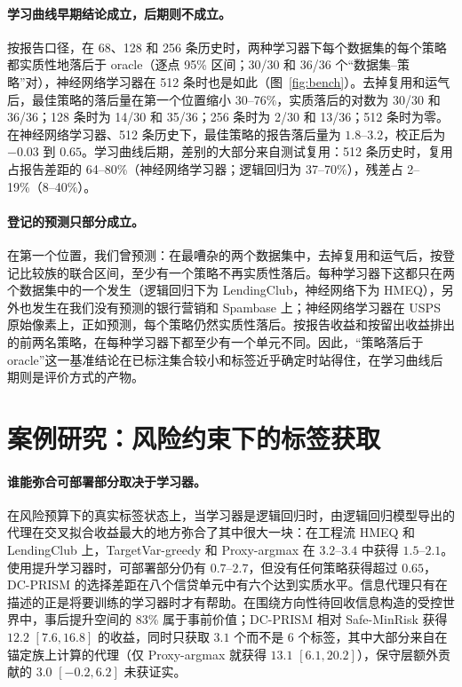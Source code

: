 \documentclass[runningheads]{llncs}
\begin{document}
\paragraph{学习曲线早期结论成立，后期则不成立。}按报告口径，在 68、128 和 256 条历史时，两种学习器下每个数据集的每个策略都实质性地落后于 oracle（逐点 95\% 区间；30/30 和 36/36 个“数据集--策略”对），神经网络学习器在 512 条时也是如此（图~\ref{fig:bench}）。去掉复用和运气后，最佳策略的落后量在第一个位置缩小 30--76\%，实质落后的对数为 30/30 和 36/36；128 条时为 14/30 和 35/36；256 条时为 2/30 和 13/36；512 条时为零。在神经网络学习器、512 条历史下，最佳策略的报告落后量为 $1.8$--$3.2$，校正后为 $-0.03$ 到 $0.65$。学习曲线后期，差别的大部分来自测试复用：512 条历史时，复用占报告差距的 64--80\%（神经网络学习器；逻辑回归为 37--70\%），残差占 2--19\%（8--40\%）。

\paragraph{登记的预测只部分成立。}在第一个位置，我们曾预测：在最嘈杂的两个数据集中，去掉复用和运气后，按登记比较族的联合区间，至少有一个策略不再实质性落后。每种学习器下这都只在两个数据集中的一个发生（逻辑回归下为 LendingClub，神经网络下为 HMEQ），另外也发生在我们没有预测的银行营销和 Spambase 上；神经网络学习器在 USPS 原始像素上，正如预测，每个策略仍然实质性落后。按报告收益和按留出收益排出的前两名策略，在每种学习器下都至少有一个单元不同。因此，“策略落后于 oracle”这一基准结论在已标注集合较小和标签近乎确定时站得住，在学习曲线后期则是评价方式的产物。

\section{案例研究：风险约束下的标签获取}
\label{sec:replay}
\paragraph{谁能弥合可部署部分取决于学习器。}在风险预算下的真实标签状态上，当学习器是逻辑回归时，由逻辑回归模型导出的代理在交叉拟合收益最大的地方弥合了其中很大一块：在工程流 HMEQ 和 LendingClub 上，TargetVar-greedy 和 Proxy-argmax 在 $3.2$--$3.4$ 中获得 $1.5$--$2.1$。使用提升学习器时，可部署部分仍有 $0.7$--$2.7$，但没有任何策略获得超过 $0.65$，DC-PRISM 的选择差距在八个信贷单元中有六个达到实质水平。信息代理只有在描述的正是将要训练的学习器时才有帮助。在围绕方向性待回收信息构造的受控世界中，事后提升空间的 83\% 属于事前价值；DC-PRISM 相对 Safe-MinRisk 获得 $12.2$ $[7.6,16.8]$ 的收益，同时只获取 $3.1$ 个而不是 6 个标签，其中大部分来自在锚定族上计算的代理（仅 Proxy-argmax 就获得 $13.1$ $[6.1,20.2]$），保守层额外贡献的 $3.0$ $[-0.2,6.2]$ 未获证实。
\end{document}

